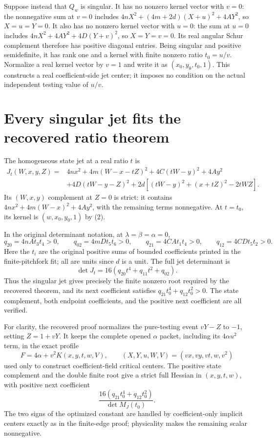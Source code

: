 Suppose instead that $Q_w$ is singular. It has no nonzero kernel
vector with $v=0$: the nonnegative sum at $v=0$ includes
$4nX^2+(4m+2d)(X+u)^2+4AY^2$, so $X=u=Y=0$.
It also has no nonzero kernel vector with $u=0$: the sum at $u=0$
includes $4nX^2+4AY^2+4D(Y+v)^2$, so $X=Y=v=0$.
Its real angular Schur complement therefore has positive diagonal
entries. Being singular and positive semidefinite, it has rank one
and a kernel with finite nonzero ratio $t_0=u/v$. Normalize a real
kernel vector by $v=1$ and write it as $(x_0,y_0,t_0,1)$.
This constructs a real coefficient-side jet center; it imposes no
condition on the actual independent testing value of $u/v$.

\section{Every singular jet fits the recovered ratio theorem}

The homogeneous state jet at a real ratio $t$ is
\begin{align*}
 J_t(W,x,y,Z)={}&4nx^2+4m(W-x-tZ)^2+4C(tW-y)^2+4Ay^2\\
 &+4D(tW-y-Z)^2
   +2d[(tW-y)^2+(x+tZ)^2-2tWZ].
\end{align*}
Its $(W,x,y)$ complement at $Z=0$ is strict: it contains
$4nx^2+4m(W-x)^2+4Ay^2$, with the remaining terms nonnegative.
At $t=t_0$, its kernel is $(w,x_0,y_0,1)$ by (2).

In the original determinant notation, at $\lambda=\beta=\alpha=0$,
\[
 q_{20}=4nAt_3t_4>0,\qquad q_{02}=4mDt_5t_6>0,
 \qquad q_{21}=4CAt_1t_4>0,\qquad q_{12}=4CDt_5t_2>0.
\]
Here the $t_i$ are the original positive sums of bounded coefficients
printed in the finite-pitchfork fit; all are units since $d$ is a
unit. The full jet determinant is
\[
 \det J_t=16(q_{20}t^4+q_{11}t^2+q_{02}).
\]
Thus the singular jet gives precisely the finite nonzero root required
by the recovered theorem, and its next coefficient satisfies
$q_{21}t_0^4+q_{12}t_0^2>0$. The state complement, both endpoint
coefficients, and the positive next coefficient are all verified.

For clarity, the recovered proof normalizes the pure-testing event
$vY-Z$ to $-1$, setting $Z=1+vY$. It keeps the complete opened
$\alpha$ packet, including its $4\alpha u^2$ term, in the exact
profile
\[
 F=4\alpha+v^2K(x,y,t,w,V),\qquad
 (X,Y,u,W,V)=(vx,vy,vt,w,v^2)
\]
used only to construct coefficient-field critical centers. The positive
state complement and the double finite root give a strict full Hessian
in $(x,y,t,w)$, with positive next coefficient
\[
 \frac{16(q_{21}t_0^4+q_{12}t_0^2)}{\det M_J(t_0)}.
\]
The two signs of the optimized constant are handled by coefficient-only
implicit centers exactly as in the finite-edge proof; physicality makes
the remaining scalar nonnegative.

